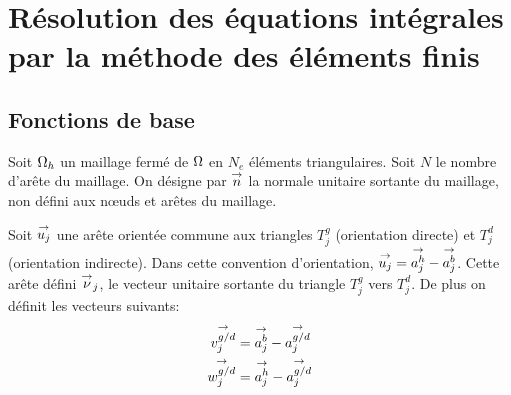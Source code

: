 \section{Résolution des équations intégrales par la méthode des éléments finis}

    \newcommand{\phij}{\vect{\phi_j}}
    \newcommand{\pj}{\vect{p_j}}
    \newcommand{\qj}{\vect{q_j}}
    \newcommand{\nuj}{\vect{\nu_j}}
    \newcommand{\uj}{\vect{u_j}}

  \subsection{Fonctions de base}

    Soit \(\Omega_h\) un maillage fermé de \(\Omega\) en \(N_e\) éléments triangulaires. Soit \(N\) le nombre d'arête du maillage. On désigne par \({\overset{\rightarrow}{n}}\) la normale unitaire sortante du maillage, non défini aux nœuds et arêtes du maillage.

    Soit \(\uj\) une arête orientée commune aux triangles \(T_j^g\) (orientation directe) et \(T_j^d\) (orientation indirecte). Dans cette convention d'orientation, \(\uj = \vect{a_j^h}-\vect{a_j^b}\). Cette arête défini \({\overset{\rightarrow}{\nu}}_j\), le vecteur unitaire sortante du triangle \(T_j^g\) vers \(T_j^d\).  De plus on définit les vecteurs suivants: 
    \begin{align}
      {\overset{\rightarrow}{v_j^{g/d}}} &= {\overset{\rightarrow}{a_j^b}} - {\overset{\rightarrow}{a_j^{g/d}}} \\
      {\overset{\rightarrow}{w_j^{g/d}}} &= {\overset{\rightarrow}{a_j^h}} - {\overset{\rightarrow}{a_j^{g/d}}}
    \end{align}

    \newcommand{\ncouche}{6}
    \newcommand{\xa}{-0.2}
    \newcommand{\ya}{0.0}
    \newcommand{\xb}{3}
    \newcommand{\yb}{0.3}
    \newcommand{\xc}{0.4}
    \newcommand{\yc}{4}
    \newcommand{\xd}{4}
    \newcommand{\yd}{3.4}

